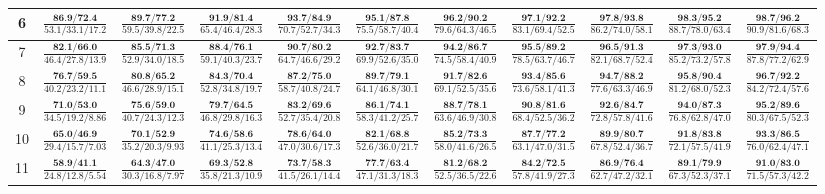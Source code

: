 \documentclass{slides}
\begin{document}
{{{\begin{tabular}{|c|c|c|c|c|c|c|c|c|c|c|}
\hline
6 & $\frac{\textbf{86.9/72.4}}{53.1/33.1/17.2}$ & $\frac{\textbf{89.7/77.2}}{59.5/39.8/22.5}$ & $\frac{\textbf{91.9/81.4}}{65.4/46.4/28.3}$ & $\frac{\textbf{93.7/84.9}}{70.7/52.7/34.3}$ & $\frac{\textbf{95.1/87.8}}{75.5/58.7/40.4}$ & $\frac{\textbf{96.2/90.2}}{79.6/64.3/46.5}$ & $\frac{\textbf{97.1/92.2}}{83.1/69.4/52.5}$ & $\frac{\textbf{97.8/93.8}}{86.2/74.0/58.1}$ & $\frac{\textbf{98.3/95.2}}{88.7/78.0/63.4}$ & $\frac{\textbf{98.7/96.2}}{90.9/81.6/68.3}$ \\
\hline
7 & $\frac{\textbf{82.1/66.0}}{46.4/27.8/13.9}$ & $\frac{\textbf{85.5/71.3}}{52.9/34.0/18.5}$ & $\frac{\textbf{88.4/76.1}}{59.1/40.3/23.7}$ & $\frac{\textbf{90.7/80.2}}{64.7/46.6/29.2}$ & $\frac{\textbf{92.7/83.7}}{69.9/52.6/35.0}$ & $\frac{\textbf{94.2/86.7}}{74.5/58.4/40.9}$ & $\frac{\textbf{95.5/89.2}}{78.5/63.7/46.7}$ & $\frac{\textbf{96.5/91.3}}{82.1/68.7/52.4}$ & $\frac{\textbf{97.3/93.0}}{85.2/73.2/57.8}$ & $\frac{\textbf{97.9/94.4}}{87.8/77.2/62.9}$ \\
\hline
8 & $\frac{\textbf{76.7/59.5}}{40.2/23.2/11.1}$ & $\frac{\textbf{80.8/65.2}}{46.6/28.9/15.1}$ & $\frac{\textbf{84.3/70.4}}{52.8/34.8/19.7}$ & $\frac{\textbf{87.2/75.0}}{58.7/40.8/24.7}$ & $\frac{\textbf{89.7/79.1}}{64.1/46.8/30.1}$ & $\frac{\textbf{91.7/82.6}}{69.1/52.5/35.6}$ & $\frac{\textbf{93.4/85.6}}{73.6/58.1/41.3}$ & $\frac{\textbf{94.7/88.2}}{77.6/63.3/46.9}$ & $\frac{\textbf{95.8/90.4}}{81.2/68.0/52.3}$ & $\frac{\textbf{96.7/92.2}}{84.2/72.4/57.6}$ \\
\hline
9 & $\frac{\textbf{71.0/53.0}}{34.5/19.2/8.86}$ & $\frac{\textbf{75.6/59.0}}{40.7/24.3/12.3}$ & $\frac{\textbf{79.7/64.5}}{46.8/29.8/16.3}$ & $\frac{\textbf{83.2/69.6}}{52.7/35.4/20.8}$ & $\frac{\textbf{86.1/74.1}}{58.3/41.2/25.7}$ & $\frac{\textbf{88.7/78.1}}{63.6/46.9/30.8}$ & $\frac{\textbf{90.8/81.6}}{68.4/52.5/36.2}$ & $\frac{\textbf{92.6/84.7}}{72.8/57.8/41.6}$ & $\frac{\textbf{94.0/87.3}}{76.8/62.8/47.0}$ & $\frac{\textbf{95.2/89.6}}{80.3/67.5/52.3}$ \\
\hline
10 & $\frac{\textbf{65.0/46.9}}{29.4/15.7/7.03}$ & $\frac{\textbf{70.1/52.9}}{35.2/20.3/9.93}$ & $\frac{\textbf{74.6/58.6}}{41.1/25.3/13.4}$ & $\frac{\textbf{78.6/64.0}}{47.0/30.6/17.3}$ & $\frac{\textbf{82.1/68.8}}{52.6/36.0/21.7}$ & $\frac{\textbf{85.2/73.3}}{58.0/41.6/26.5}$ & $\frac{\textbf{87.7/77.2}}{63.1/47.0/31.5}$ & $\frac{\textbf{89.9/80.7}}{67.8/52.4/36.7}$ & $\frac{\textbf{91.8/83.8}}{72.1/57.5/41.9}$ & $\frac{\textbf{93.3/86.5}}{76.0/62.4/47.1}$ \\
\hline
11 & $\frac{\textbf{58.9/41.1}}{24.8/12.8/5.54}$ & $\frac{\textbf{64.3/47.0}}{30.3/16.8/7.97}$ & $\frac{\textbf{69.3/52.8}}{35.8/21.3/10.9}$ & $\frac{\textbf{73.7/58.3}}{41.5/26.1/14.4}$ & $\frac{\textbf{77.7/63.4}}{47.1/31.3/18.3}$ & $\frac{\textbf{81.2/68.2}}{52.5/36.5/22.6}$ & $\frac{\textbf{84.2/72.5}}{57.8/41.9/27.3}$ & $\frac{\textbf{86.9/76.4}}{62.7/47.2/32.1}$ & $\frac{\textbf{89.1/79.9}}{67.3/52.3/37.1}$ & $\frac{\textbf{91.0/83.0}}{71.5/57.3/42.2}$ \\

\end{tabular}}}}
\end{document}
